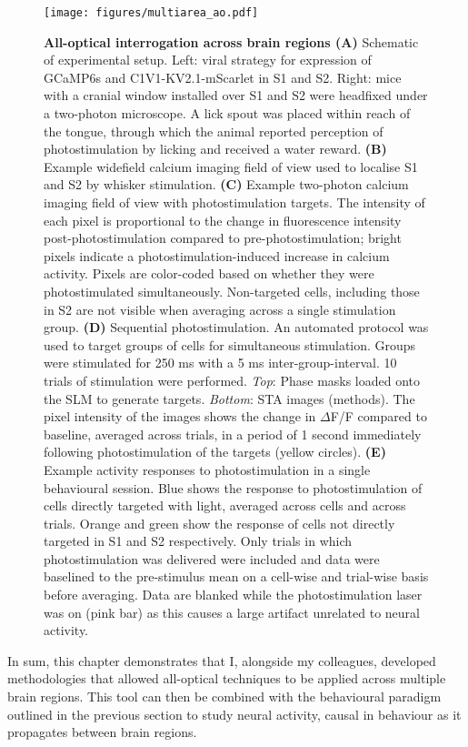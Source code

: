 \begin{figure}[h]
\hspace*{-0.25in}
\texttt{[image: figures/multiarea\_ao.pdf]}
\caption[\textbf{All-optical interrogation across brain regions}]{
\textbf{All-optical interrogation across brain regions (A)} Schematic of experimental setup. Left: viral strategy for expression of GCaMP6s and C1V1-KV2.1-mScarlet in S1 and S2.  Right: mice with a cranial window installed over S1 and S2 were headfixed under a two-photon microscope. A lick spout was placed within reach of the tongue, through which the animal reported perception of photostimulation by licking and received a water reward. \textbf{(B)} Example widefield calcium imaging field of view used to localise S1 and S2 by whisker stimulation. \textbf{(C)} Example two-photon calcium imaging field of view with photostimulation targets. The intensity of each pixel is proportional to the change in fluorescence intensity post-photostimulation compared to pre-photostimulation; bright pixels indicate a photostimulation-induced increase in calcium activity. Pixels are color-coded based on whether they were photostimulated simultaneously. Non-targeted cells, including those in S2 are not visible when averaging across a single stimulation group.
\textbf{(D)} Sequential photostimulation. An
automated protocol was used to target groups of cells for simultaneous stimulation. Groups
were stimulated for 250 ms with a 5 ms inter-group-interval. 10 trials of stimulation were
performed. \textit{Top}: Phase masks loaded onto the SLM to generate targets. \textit{Bottom}: STA images (methods). The pixel intensity of the images shows the change in $\Delta$F/F compared to baseline, averaged across trials, in a period of 1 second immediately following photostimulation of the targets (yellow circles). \textbf{(E)} Example activity responses to photostimulation in a single behavioural session. Blue shows the response to photostimulation of cells directly targeted with light, averaged across cells and across trials. Orange and green show the response of cells not directly targeted in S1 and S2 respectively. Only trials in which photostimulation was delivered were included and data were baselined to the pre-stimulus mean on a cell-wise and trial-wise basis before averaging. Data are blanked while the photostimulation laser was on (pink bar) as this causes a large artifact unrelated to neural activity.
} 
\label{fig:s1s2}
\end{figure}

In sum, this chapter demonstrates that I, alongside my colleagues, developed methodologies that allowed all-optical techniques to be applied across multiple brain regions. This tool can then be combined with the behavioural paradigm outlined in the previous section to study neural activity, causal in behaviour as it propagates between brain regions.